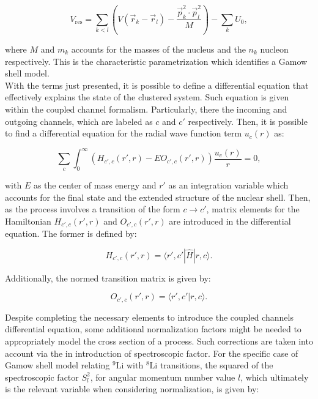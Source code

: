 \documentclass[openany]{book}
\begin{document}
\begin{equation}\label{eq:micro_shellGamow_residual}
	V_{\mathrm{res}} =  \sum_{k < l} \left( {V(\vec r_k - \vec r_l) - \frac{\vec p^2_k \cdot \vec p^2_l}{M}} \right) - \sum_k U_0,
\end{equation}

where $M$ and $m_k$ accounts for the masses of the nucleus and the $n_k$ nucleon respectively. This is the characteristic parametrization which identifies a Gamow shell model. \\

With the terms just presented, it is possible to define a differential equation that effectively explains the state of the clustered system. Such equation is given within the coupled channel formalism. Particularly, there the incoming and outgoing channels, which are labeled as $c$ and $c'$ respectively. Then, it is possible to find a differential equation for the radial wave function term $u_c(r)$ as:

\begin{equation}\label{eq:micro_shellGamow_coupledCahnnel}
	\sum_c \int_0^\infty {(H_{c', c} (r', r) - E O_{c', c}(r', r )) \frac{u_c(r)}{r}} = 0,
\end{equation}

with $E$ as the center of mass energy and $r'$ as an integration variable which accounts for the final state and the extended structure of the nuclear shell. Then, as the process involves a transition of the form $c \rightarrow c'$, matrix elements for the Hamiltonian $H_{c', c} (r', r)$ and $O_{c', c}(r', r )$ are introduced in the differential equation. The former is defined by:

\begin{equation}\label{eq:micro_shellGamow_coupledCahnnel_hamiltonian}
	H_{c', c} (r', r) = \langle r', c' | \hat H |  r, c \rangle. 
\end{equation}

Additionally, the normed transition matrix is given by:

\begin{equation}\label{eq:micro_shellGamow_coupledCahnnel_normOperator}
	O_{c', c} (r', r) = \langle r', c' |  r, c \rangle. 
\end{equation}

Despite completing the necessary elements to introduce the coupled channels differential equation, some additional normalization factors might be needed to appropriately model the cross section of a process. Such corrections are taken into account via the in introduction of spectroscopic factor. For the specific case of  Gamow shell model relating $\mathrm{{}^{9}Li}$ with $\mathrm{{}^{8}Li}$ transitions, the squared of the spectroscopic factor $S^2_{l}$, for angular momentum number value $l$,  which ultimately is the relevant variable when considering normalization, is given by:
\end{document}
